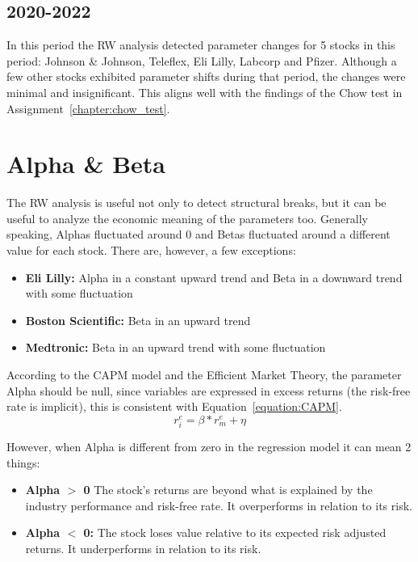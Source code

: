 \subsection{2020-2022}

In this period the RW analysis detected parameter changes for 5 stocks in this period: Johnson \& Johnson, Teleflex, Eli Lilly, 
Labcorp and Pfizer.
Although a few other stocks exhibited parameter shifts during that period, the changes were minimal and insignificant. 
This aligns well with the findings of the Chow test in Assignment~\ref{chapter:chow_test}.

\section{Alpha \& Beta}

The RW analysis is useful not only to detect structural breaks, but it can be useful to analyze the economic meaning of the
parameters too.
Generally speaking, Alphas fluctuated around 0 and Betas fluctuated around a different value for each stock.
There are, however, a few exceptions:
\begin{itemize}
    \item \textbf{Eli Lilly:} Alpha in a constant upward trend and Beta in a downward trend with some fluctuation
    \item \textbf{Boston Scientific:} Beta in an upward trend
    \item \textbf{Medtronic:} Beta in an upward trend with some fluctuation
\end{itemize}

According to the CAPM model and the Efficient Market Theory, the parameter Alpha should be null, since variables are expressed
in excess returns (the risk-free rate is implicit), this is consistent with Equation~\ref{equation:CAPM}.
\begin{equation}
    r^{e}_{i} = \beta * r^{e}_{m} + \eta
\end{equation}\label{equation:CAPM}

However, when Alpha is different from zero in the regression model it can mean 2 things:
\begin{itemize}
    \item \textbf{Alpha $>$ 0} The stock's returns are beyond what is explained by the industry performance and risk-free rate. 
    It overperforms in relation to its risk.
    \item \textbf{Alpha $<$ 0:} The stock loses value relative to its expected risk adjusted returns. 
    It underperforms in relation to its risk.
\end{itemize}

